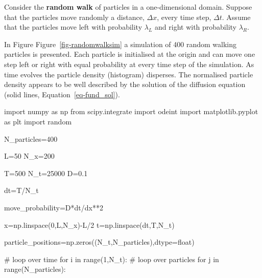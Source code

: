 \documentclass[
  letterpaper,
  DIV=11,
  numbers=noendperiod]{scrreprt}
\newenvironment{Shaded}{\begin{snugshade}}{\end{snugshade}}
\newcommand{\BuiltInTok}[1]{\textcolor[rgb]{0.00,0.23,0.31}{#1}}
\newcommand{\CommentTok}[1]{\textcolor[rgb]{0.37,0.37,0.37}{#1}}
\newcommand{\ControlFlowTok}[1]{\textcolor[rgb]{0.00,0.23,0.31}{#1}}
\newcommand{\DecValTok}[1]{\textcolor[rgb]{0.68,0.00,0.00}{#1}}
\newcommand{\FloatTok}[1]{\textcolor[rgb]{0.68,0.00,0.00}{#1}}
\newcommand{\ImportTok}[1]{\textcolor[rgb]{0.00,0.46,0.62}{#1}}
\newcommand{\KeywordTok}[1]{\textcolor[rgb]{0.00,0.23,0.31}{#1}}
\newcommand{\NormalTok}[1]{\textcolor[rgb]{0.00,0.23,0.31}{#1}}
\newcommand{\OperatorTok}[1]{\textcolor[rgb]{0.37,0.37,0.37}{#1}}
\theoremstyle{plain}
\theoremstyle{definition}
\theoremstyle{plain}
\theoremstyle{remark}
\begin{document}
Consider the \textbf{random walk} of particles in a one-dimensional
domain. Suppose that the particles move randomly a distance,
\(\Delta x\), every time step, \(\Delta t\). Assume that the particles
move left with probability \(\lambda_L\) and right with probability
\(\lambda_R\).

In Figure Figure~\ref{fig-randomwalksim} a simulation of 400 random
walking particles is presented. Each particle is initialised at the
origin and can move one step left or right with equal probability at
every time step of the simulation. As time evolves the particle density
(histogram) disperses. The normalised particle density appears to be
well described by the solution of the diffusion equation (solid lines,
Equation~\ref{eq-fund_sol}).

\begin{Shaded}
\begin{Highlighting}[]
\ImportTok{import}\NormalTok{ numpy }\ImportTok{as}\NormalTok{ np}
\ImportTok{from}\NormalTok{ scipy.integrate }\ImportTok{import}\NormalTok{ odeint}
\ImportTok{import}\NormalTok{ matplotlib.pyplot }\ImportTok{as}\NormalTok{ plt}
\ImportTok{import}\NormalTok{ random}

\NormalTok{N\_particles}\OperatorTok{=}\DecValTok{400}

\NormalTok{L}\OperatorTok{=}\DecValTok{50}
\NormalTok{N\_x}\OperatorTok{=}\DecValTok{200}

\NormalTok{T}\OperatorTok{=}\DecValTok{500}
\NormalTok{N\_t}\OperatorTok{=}\DecValTok{25000}
\NormalTok{D}\OperatorTok{=}\FloatTok{0.1}

\NormalTok{dt}\OperatorTok{=}\NormalTok{T}\OperatorTok{/}\NormalTok{N\_t}

\NormalTok{move\_probability}\OperatorTok{=}\NormalTok{D}\OperatorTok{*}\NormalTok{dt}\OperatorTok{/}\NormalTok{dx}\OperatorTok{**}\DecValTok{2}

\NormalTok{x}\OperatorTok{=}\NormalTok{np.linspace(}\DecValTok{0}\NormalTok{,L,N\_x)}\OperatorTok{{-}}\NormalTok{L}\OperatorTok{/}\DecValTok{2}
\NormalTok{t}\OperatorTok{=}\NormalTok{np.linspace(dt,T,N\_t)}

\NormalTok{particle\_positions}\OperatorTok{=}\NormalTok{np.zeros((N\_t,N\_particles),dtype}\OperatorTok{=}\BuiltInTok{float}\NormalTok{)}

\CommentTok{\# loop over time}
\ControlFlowTok{for}\NormalTok{ i }\KeywordTok{in} \BuiltInTok{range}\NormalTok{(}\DecValTok{1}\NormalTok{,N\_t):}
  \CommentTok{\# loop over particles}
  \ControlFlowTok{for}\NormalTok{ j }\KeywordTok{in} \BuiltInTok{range}\NormalTok{(N\_particles):}


\end{Highlighting}
\end{Shaded}
\end{document}
